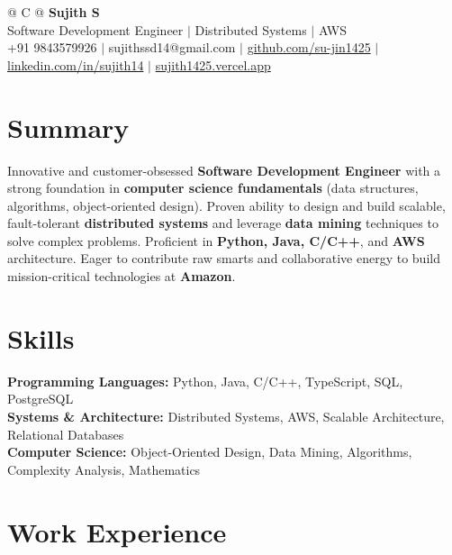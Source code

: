 \documentclass[a4paper,10pt]{article}
\newcommand{\ulink}[2]{\href{#1}{#2}}
\begin{document}
\pagestyle{empty}

\begin{tabularx}{\linewidth}{@{} C @{}}
{\color[HTML]{000000}\fontsize{30}{35}\selectfont\bfseries Sujith S} \\[5pt]
{\fontsize{10.5}{12.5}\selectfont\color[HTML]{3A3A3A}
Software Development Engineer $|$ Distributed Systems $|$ AWS} \\[6pt]
{\fontsize{9.5}{11.5}\selectfont\textcolor[HTML]{3A3A3A}{+91 9843579926 $|$ sujithssd14@gmail.com $|$ \ulink{https://github.com/su-jin1425}{github.com/su-jin1425} $|$ \ulink{https://linkedin.com/in/sujith14}{linkedin.com/in/sujith14} $|$ \ulink{https://sujith1425.vercel.app}{sujith1425.vercel.app}}}
\end{tabularx}

\section{Summary}
\vspace{2pt}

{\color[HTML]{0A0A0A}\fontsize{11}{14}\selectfont
Innovative and customer-obsessed \textbf{Software Development Engineer} with a strong foundation in \textbf{computer science fundamentals} (data structures, algorithms, object-oriented design). Proven ability to design and build scalable, fault-tolerant \textbf{distributed systems} and leverage \textbf{data mining} techniques to solve complex problems. Proficient in \textbf{Python, Java, C/C++}, and \textbf{AWS} architecture. Eager to contribute raw smarts and collaborative energy to build mission-critical technologies at \textbf{Amazon}.}

\section{Skills}
\vspace{2pt}

{\color[HTML]{0A0A0A}\fontsize{11}{14}\selectfont
\textbf{Programming Languages:} Python, Java, C/C++, TypeScript, SQL, PostgreSQL \\[2pt]
\textbf{Systems \& Architecture:} Distributed Systems, AWS, Scalable Architecture, Relational Databases \\[2pt]
\textbf{Computer Science:} Object-Oriented Design, Data Mining, Algorithms, Complexity Analysis, Mathematics}

\section{Work Experience}
\vspace{2pt}
\end{document}
